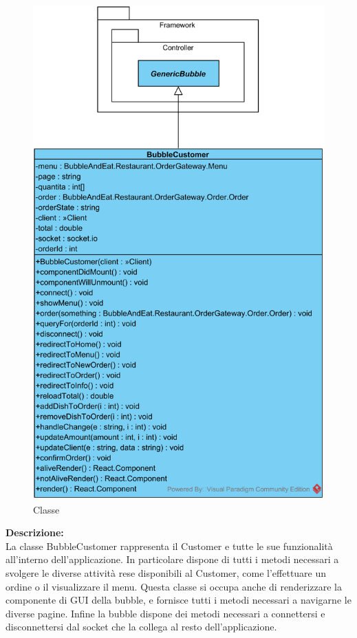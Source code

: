\paragraph[::BubbleCustomer]{\class}\mbox{}\\ \label{\class}
\begin{figure}[H]
	\centering
	\includegraphics[width=12cm]{./diagrammi/demo/client/customer/bubblecustomer.png}
	\caption{Classe \class}
\end{figure}
\textbf{Descrizione:}\\
La classe BubbleCustomer rappresenta il Customer e tutte le sue funzionalità all'interno dell'applicazione. In particolare dispone di tutti i metodi necessari a svolgere le diverse attività rese disponibili al Customer, come l'effettuare un ordine o il visualizzare il menu. Questa classe si occupa anche di renderizzare la componente di GUI della bubble, e fornisce tutti i metodi necessari a navigarne le diverse pagine. Infine la bubble dispone dei metodi necessari a connettersi e disconnettersi dal socket che la collega al resto dell'applicazione.

